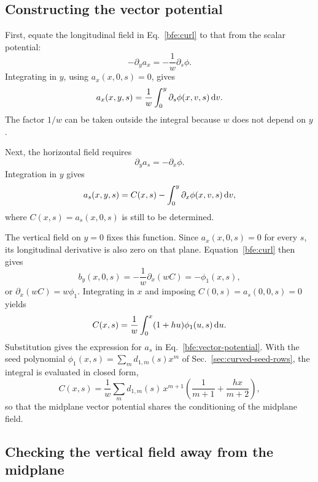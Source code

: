 \subsection{Constructing the vector potential}

First, equate the longitudinal field in Eq.~\eqref{bfe:curl} to that from
the scalar potential:
\begin{equation}
 -\partial_y a_x=-\frac{1}{w}\partial_s\phi.
\end{equation}
Integrating in \(y\), using \(a_x(x,0,s)=0\), gives
\begin{equation}
 a_x(x,y,s)=\frac{1}{w}\int_0^y\partial_s\phi(x,v,s)\,\text{d} v.
\end{equation}
The factor \(1/w\) can be taken outside the integral because \(w\) does
not depend on \(y\).

Next, the horizontal field requires
\begin{equation}
 \partial_y a_s=-\partial_x\phi.
\end{equation}
Integration in \(y\) gives
\begin{equation}
 a_s(x,y,s)=C(x,s)-\int_0^y\partial_x\phi(x,v,s)\,\text{d} v,
\end{equation}
where \(C(x,s)=a_s(x,0,s)\) is still to be determined.

The vertical field on \(y=0\) fixes this function. Since
\(a_x(x,0,s)=0\) for every \(s\), its longitudinal derivative is also
zero on that plane. Equation~\eqref{bfe:curl} then gives
\begin{equation}
 b_y(x,0,s)=-\frac{1}{w}\partial_x(wC)=-\phi_1(x,s),
\end{equation}
or \(\partial_x(wC)=w\phi_1\). Integrating in \(x\) and imposing
\(C(0,s)=a_s(0,0,s)=0\) yields
\begin{equation}
 C(x,s)=\frac{1}{w}\int_0^x(1+hu)\phi_1(u,s)\,\text{d} u.
\end{equation}
Substitution gives the expression for \(a_s\) in
Eq.~\eqref{bfe:vector-potential}. With the seed polynomial
\(\phi_1(x,s)=\sum_m d_{1,m}(s)x^m\) of Sec.~\ref{sec:curved-seed-rows},
the integral is evaluated in closed form,
\begin{equation}
 C(x,s)=\frac{1}{w}\sum_m d_{1,m}(s)\,x^{m+1}
        \left(\frac{1}{m+1}+\frac{hx}{m+2}\right),
\end{equation}
so that the midplane vector potential shares the conditioning of the
midplane field.

\subsection{Checking the vertical field away from the midplane}

